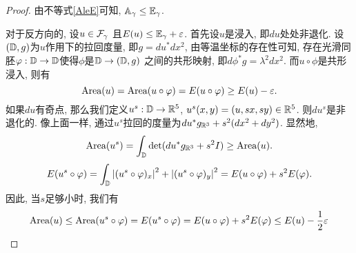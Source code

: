 \begin{proof}
    由不等式\eqref{AleE}可知, ${\mathbb{A}_\gamma} \le {\mathbb{E}_\gamma}$.
    \par 对于反方向的, 设$u\in {\mathcal{F}_\gamma}$ 且${E}(u) \le {\mathbb{E}_\gamma} + \varepsilon$. 首先设$u$是浸入, 即$du$处处非退化. 设$({\mathbb{D}},g)$为$u$作用下的拉回度量, 即$g=du^*dx^2$, 由等温坐标的存在性可知, 存在光滑同胚$\varphi: {\mathbb{D}} \to {\mathbb{D}}$使得$\phi$是$\mathbb{D} \to ({\mathbb{D}},g)$ 之间的共形映射, 即$d\phi ^* g=\lambda^2dx^2$. 而$u\circ \phi$是共形浸入, 则有
    \begin{equation}
        \text{Area}(u)=\text{Area}(u\circ \varphi)={E}(u\circ \varphi) \ge {E}(u)-\varepsilon.
    \end{equation}
    如果$du$有奇点, 那么我们定义$u^s: {\mathbb{D}} \to \mathbb{R}^5$, $u^s(x,y)=(u,sx,sy)\in \mathbb{R}^5$. 则$du^s$是非退化的. 像上面一样, 通过$u^s$拉回的度量为$du^*g_{\mathbb{R}^3}+s^2(dx^2+dy^2)$. 显然地, 
    \begin{equation}
        \text{Area}(u^s)=\int_{\mathbb{D}} \det (du^*g_{\mathbb{R}^3}+s^2I) \ge \text{Area}(u).
    \end{equation}
    \begin{equation}
        {E}(u^s\circ\varphi)=\int_{\mathbb{D}} \left | (u^s\circ \varphi)_x \right |^2+ \left | (u^s\circ \varphi)_y \right |^2 ={E}(u\circ \varphi)+s^2{E}(\varphi).
    \end{equation}
    因此, 当$s$足够小时, 我们有
    \begin{equation}
        \text{Area}(u) \le \text{Area}(u^s\circ \varphi) = {E}(u^s\circ \varphi) ={E}(u\circ \varphi) +s^2{E}(\varphi) \le {E}(u)-\frac{1}{2}\varepsilon
    \end{equation}
\end{proof}